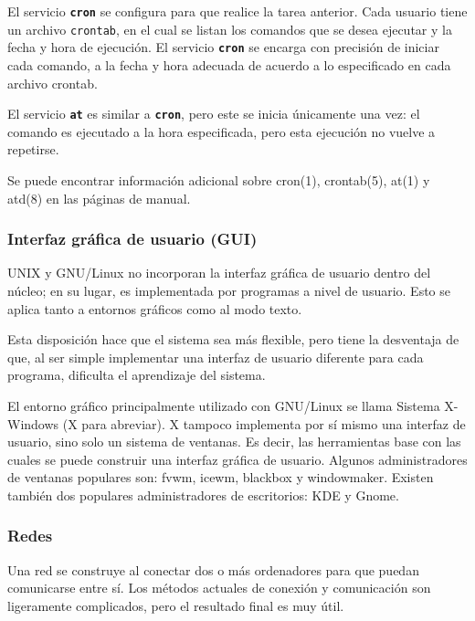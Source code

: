 \documentclass[12pt]{article}
\begin{document}
\begin{}
 El servicio \texttt{\textbf{cron}} se configura para que realice la
tarea anterior. Cada usuario tiene un archivo \texttt{crontab}, en
el cual se listan los comandos que se desea ejecutar y la fecha y hora de
ejecución. El servicio \texttt{\textbf{cron}} se encarga con precisión de
iniciar cada comando, a la fecha y hora adecuada de acuerdo a lo especificado en
cada archivo crontab.  

 El servicio \texttt{\textbf{at}} es similar a \texttt{\textbf{cron}},
pero este se inicia únicamente una vez: el comando es ejecutado a la hora
especificada, pero esta ejecución no vuelve a repetirse.  

 Se puede encontrar información adicional sobre cron(1), crontab(5), at(1)
y atd(8) en las páginas de manual.  



\subsubsection{ Interfaz gráfica de usuario (GUI)}

 UNIX y GNU/Linux no incorporan la interfaz gráfica de usuario dentro del
núcleo; en su lugar, es implementada por programas a nivel de usuario. Esto se
aplica tanto a entornos gráficos como al modo texto.  

 Esta disposición hace que el sistema sea más flexible, pero tiene la
desventaja de que, al ser simple implementar una interfaz de usuario diferente
para cada programa, dificulta el aprendizaje del sistema.  

 El entorno gráfico principalmente utilizado con GNU/Linux se llama
Sistema X-Windows (X para abreviar). X tampoco implementa por sí mismo una
interfaz de usuario, sino solo un sistema de ventanas. Es decir, las
herramientas base con las cuales se puede construir una interfaz gráfica de
usuario. Algunos administradores de ventanas populares son: fvwm, icewm,
blackbox y windowmaker. Existen también dos populares administradores de
escritorios: KDE y Gnome.  




\subsubsection{ Redes}

 Una red se construye al conectar dos o más ordenadores para que puedan
comunicarse entre sí. Los métodos actuales de conexión y comunicación son
ligeramente complicados, pero el resultado final es muy útil.  


\end{}
\end{document}

